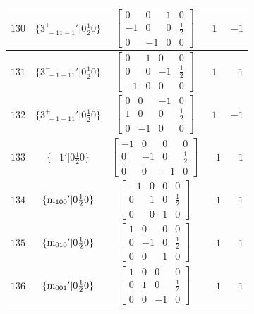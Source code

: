 \documentclass[fleqn,8pt]{jsarticle}
\begin{document}
\begin{longtable}{ccccc}
$ 130 $ & $ \{3^{+}_{\,\,-11-1}{}'|0 \frac{1}{2} 0\} $ & $ \begin{bmatrix} 0 & 0 & 1 & 0 \\ -1 & 0 & 0 & \frac{1}{2} \\ 0 & -1 & 0 & 0 \end{bmatrix} $ & $ 1 $ & $ -1 $ \\ \hline
$ 131 $ & $ \{3^{-}_{\,\,-1-11}{}'|0 \frac{1}{2} 0\} $ & $ \begin{bmatrix} 0 & 1 & 0 & 0 \\ 0 & 0 & -1 & \frac{1}{2} \\ -1 & 0 & 0 & 0 \end{bmatrix} $ & $ 1 $ & $ -1 $ \\ \hline
$ 132 $ & $ \{3^{+}_{\,\,-1-11}{}'|0 \frac{1}{2} 0\} $ & $ \begin{bmatrix} 0 & 0 & -1 & 0 \\ 1 & 0 & 0 & \frac{1}{2} \\ 0 & -1 & 0 & 0 \end{bmatrix} $ & $ 1 $ & $ -1 $ \\ \hline
$ 133 $ & $ \{-1{}'|0 \frac{1}{2} 0\} $ & $ \begin{bmatrix} -1 & 0 & 0 & 0 \\ 0 & -1 & 0 & \frac{1}{2} \\ 0 & 0 & -1 & 0 \end{bmatrix} $ & $ -1 $ & $ -1 $ \\ \hline
$ 134 $ & $ \{{\rm m}_{100}{}'|0 \frac{1}{2} 0\} $ & $ \begin{bmatrix} -1 & 0 & 0 & 0 \\ 0 & 1 & 0 & \frac{1}{2} \\ 0 & 0 & 1 & 0 \end{bmatrix} $ & $ -1 $ & $ -1 $ \\ \hline
$ 135 $ & $ \{{\rm m}_{010}{}'|0 \frac{1}{2} 0\} $ & $ \begin{bmatrix} 1 & 0 & 0 & 0 \\ 0 & -1 & 0 & \frac{1}{2} \\ 0 & 0 & 1 & 0 \end{bmatrix} $ & $ -1 $ & $ -1 $ \\ \hline
$ 136 $ & $ \{{\rm m}_{001}{}'|0 \frac{1}{2} 0\} $ & $ \begin{bmatrix} 1 & 0 & 0 & 0 \\ 0 & 1 & 0 & \frac{1}{2} \\ 0 & 0 & -1 & 0 \end{bmatrix} $ & $ -1 $ & $ -1 $ \\ \hline

\end{longtable}
\end{document}
